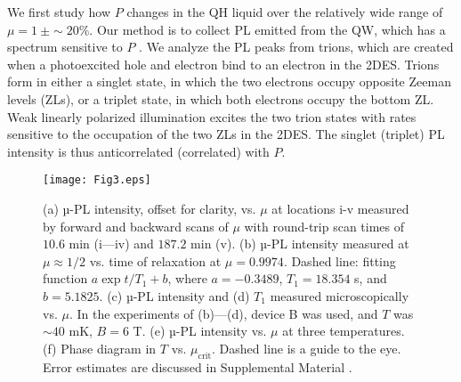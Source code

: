 \documentclass
[aps,prl,twocolumn,superscriptaddress,showpacs,floatfix]{revtex4-1}%
\begin{document}
We first study how $P$ changes in the QH liquid over the relatively wide range of $\mu=1~\pm {\sim}20\%$. Our method is to collect PL emitted from the QW, which has a spectrum sensitive to $P$ \cite{Hayakawa,MoorePRL}. We analyze the PL peaks from trions, which are created when a photoexcited hole and electron bind to an electron in the 2DES. Trions form in either a singlet state, in which the two electrons occupy opposite Zeeman levels (ZLs), or a triplet state, in which both electrons occupy the bottom ZL. Weak linearly polarized illumination excites the two trion states with rates sensitive to the occupation of the two ZLs in the 2DES. The singlet (triplet) PL intensity is thus anticorrelated (correlated) with $P$. 
\begin{figure}[t]
	\par
	\begin{center}
		\texttt{[image: Fig3.eps]}
	\end{center}
	\caption{(a) µ-PL intensity, offset for clarity, vs. $\mu$ at locations i-v measured by forward and backward scans of $\mu$ with round-trip scan times of $10.6$ min (i---iv) and $187.2$ min (v). (b) µ-PL intensity measured at $\mu\approx1/2$ vs. time of relaxation at $\mu=0.9974$. Dashed line: fitting function $a\exp{t}/{T_{1}}+b$, where $a=-0.3489$, $T_{1}=18.354$ s, and $b=5.1825$. (c) µ-PL intensity and (d) $T_{1}$ measured microscopically vs. $\mu$. In the experiments of (b)---(d), device B was used, and $T$ was ${\sim}40$ mK, $B=6$ T. (e) µ-PL intensity vs. $\mu$ at three temperatures. (f) Phase diagram in $T$ vs. $\mu_{\text{crit}}$. Dashed line is a guide to the eye. Error estimates are discussed in Supplemental Material \cite{SI}.}%
	\label{fig:fig3}%
\end{figure}
\end{document}
